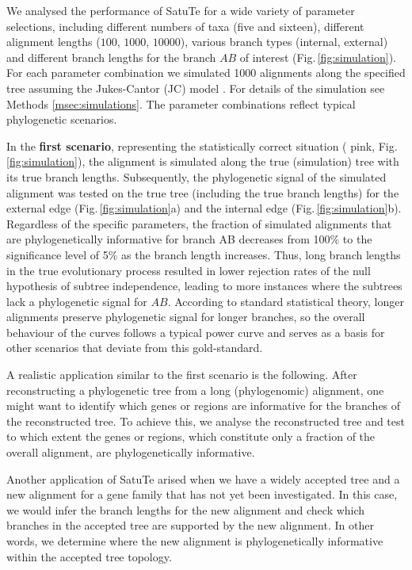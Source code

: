 We analysed the performance of SatuTe for a wide variety of parameter selections, including different numbers of taxa (five and sixteen), different alignment lengths ($100$, $1000$, $10000$), various branch types (internal, external) and different branch lengths for the branch $AB$ of interest (Fig.\,\ref{fig:simulation}). For each parameter
combination we simulated 1000 alignments along the specified tree assuming the Jukes-Cantor (JC) model . For details of the simulation see Methods \ref{msec:simulations}. The parameter combinations reflect typical phylogenetic scenarios.

\medskip

In the \textbf{first scenario}, representing the statistically correct situation ({\color{truetree} pink}, Fig.\,\ref{fig:simulation}), the alignment is simulated along the true (simulation) tree with its true branch lengths. Subsequently, the phylogenetic signal of the simulated alignment was tested on the true tree
(including the true branch lengths) for the external edge (Fig.\,\ref{fig:simulation}a) and the internal edge (Fig.\,\ref{fig:simulation}b). Regardless of the specific parameters, the fraction of simulated alignments that are phylogenetically informative for branch AB decreases from 100\% to the significance level of 5\% as the
branch length increases. Thus, long branch lengths in the true evolutionary process resulted in lower rejection rates of the null hypothesis of subtree independence, leading to more instances where the subtrees lack a phylogenetic signal for $AB$. According to standard statistical theory, longer alignments preserve phylogenetic signal for longer branches, so the overall behaviour of the curves follows a typical power curve and serves as a basis for other scenarios that deviate from this gold-standard.

\medskip 


A realistic application similar to the first scenario is the following. After reconstructing a phylogenetic tree from a long (phylogenomic) alignment, one might want to identify which genes or regions are informative for the branches of the reconstructed tree. To achieve this, we analyse the reconstructed tree and test to which extent the genes or regions, which constitute only a fraction of the overall alignment, are phylogenetically informative.

\medskip 

Another application of SatuTe arised when we have a widely accepted tree and a new alignment for a gene family that has not yet been investigated. In this case, we would infer the branch lengths for the new alignment and check which branches in the accepted tree are supported by the new alignment. In other words, we determine where the new alignment is phylogenetically informative within the accepted tree topology. 

